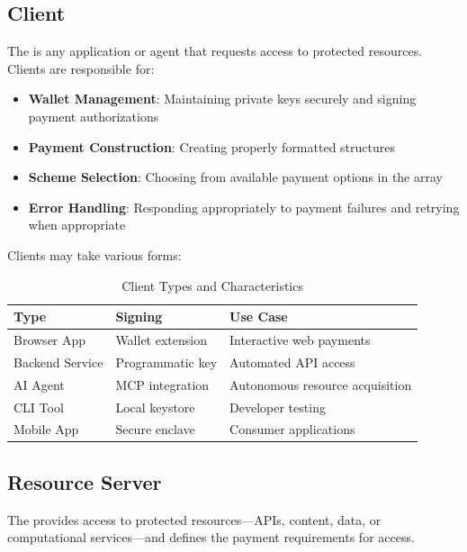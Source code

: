 \subsection{Client}
\label{subsec:client}

The  is any application or agent that requests access to protected resources. Clients are responsible for:

\begin{itemize}
    \item \textbf{Wallet Management}: Maintaining private keys securely and signing payment authorizations
    \item \textbf{Payment Construction}: Creating properly formatted  structures
    \item \textbf{Scheme Selection}: Choosing from available payment options in the  array
    \item \textbf{Error Handling}: Responding appropriately to payment failures and retrying when appropriate
\end{itemize}

Clients may take various forms:

\begin{table}[htbp]
\centering
\caption{Client Types and Characteristics}
\label{tab:client-types}
\begin{tabular}{llp{5cm}}
\toprule
\textbf{Type} & \textbf{Signing} & \textbf{Use Case} \\
\midrule
Browser App & Wallet extension & Interactive web payments \\
Backend Service & Programmatic key & Automated API access \\
AI Agent & MCP integration & Autonomous resource acquisition \\
CLI Tool & Local keystore & Developer testing \\
Mobile App & Secure enclave & Consumer applications \\
\bottomrule
\end{tabular}
\end{table}

\subsection{Resource Server}
\label{subsec:resource-server}

The  provides access to protected resources---APIs, content, data, or computational services---and defines the payment requirements for access.

